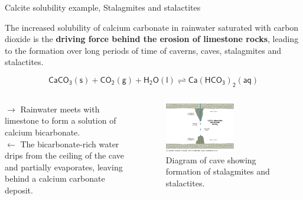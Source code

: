 %
%
\begin{frame}{Calcite solubility example, Stalagmites and stalactites}

The increased solubility of calcium carbonate in rainwater saturated with carbon dioxide is the {\bf driving force behind the erosion of limestone rocks}, leading to the formation over long periods of time of caverns, caves, stalagmites and stalactites.

\[\mathsf{CaCO_3(s) + CO_2(g) + H_2O(l) \rightleftharpoons Ca(HCO_3)_2(aq)}\]

\vskip -10pt
\begin{columns}[t]
\vskip 10pt
$\rightarrow$ Rainwater meets with limestone to form a solution of calcium bicarbonate. \\[5pt]
$\leftarrow$ The bicarbonate-rich water drips from the ceiling of the cave and partially evaporates, leaving behind a calcium carbonate deposit.


\begin{figure}\centering
\includegraphics[width=0.6\textwidth]{figures/chemical-equilibrium/stalagmites-stalactities.jpg}
\caption*{\footnotesize
Diagram of cave showing formation of stalagmites and stalactites.}
\end{figure}

\end{columns}

\end{frame}
%
